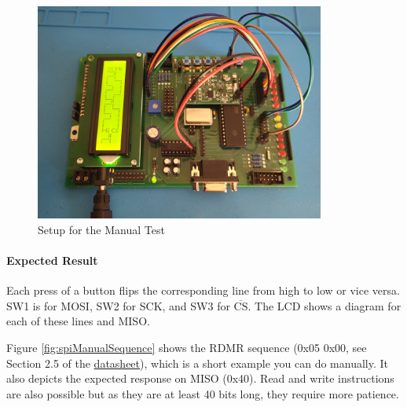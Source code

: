 \documentclass{article}
\newcommand{\datasheet}{\href{https://ww1.microchip.com/downloads/aemDocuments/documents/MPD/ProductDocuments/DataSheets/23A102423LC1024-1-Mbit-SPI-Serial-SRAM-with-SDI-SQI-Interface-20005142.pdf}{datasheet}}
\newcommand{\CS}{$\overline{\mbox{CS}}$}
\begin{document}
\begin{figure}[htb]
\centering
\includegraphics[width=0.85\textwidth]{Pictures/Manual.jpg}
\caption{Setup for the Manual Test}
\label{fig:manual}
\end{figure}

\paragraph{Expected Result}
Each press of a button flips the corresponding line from high to low or vice versa. SW1 is for MOSI, SW2 for SCK, and SW3 for \CS. The LCD shows a diagram for each of these lines and MISO. 

Figure \ref{fig:spiManualSequence} shows the RDMR sequence (0x05 0x00, see Section 2.5 of the \datasheet{}), which is a short example you can do manually. It also depicts the expected response on MISO (0x40). Read and write instructions are also possible but as they are at least 40 bits long, they require more patience. 
\end{document}
